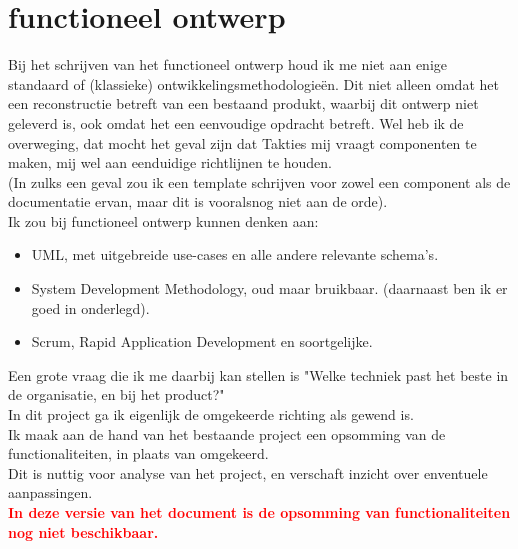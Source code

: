 \documentclass{article}
\begin{document}
\newpage
\section{functioneel ontwerp}

Bij het schrijven van het functioneel ontwerp houd ik me niet aan enige standaard of (klassieke) ontwikkelingsmethodologie\"{e}n. Dit niet alleen omdat het een reconstructie betreft van een bestaand produkt, waarbij dit ontwerp niet geleverd is, ook omdat het een eenvoudige opdracht betreft. Wel heb ik de overweging, dat mocht het geval zijn dat Takties mij vraagt componenten te maken, mij wel aan eenduidige richtlijnen te houden. \\
(In zulks een geval zou ik een template schrijven voor zowel een component als de documentatie ervan, maar dit is vooralsnog niet aan de orde). \\

Ik zou bij functioneel ontwerp kunnen denken aan: \\

\begin{itemize}
\item UML, met uitgebreide use-cases en alle andere relevante schema's.
\item System Development Methodology, oud maar bruikbaar. (daarnaast ben ik er goed in onderlegd).
\item Scrum, Rapid Application Development en soortgelijke.
\end{itemize}

Een grote vraag die ik me daarbij kan stellen is "Welke techniek past het beste in de organisatie, en bij het product?" \\

In dit project ga ik eigenlijk de omgekeerde richting als gewend is. \\
Ik maak aan de hand van het bestaande project een opsomming van de functionaliteiten, in plaats van omgekeerd. \\

Dit is nuttig voor analyse van het project, en verschaft inzicht over enventuele aanpassingen. \\


\textcolor{red}{\textbf{In deze versie van het document is de opsomming van functionaliteiten nog niet beschikbaar.}}
	

\end{document}
